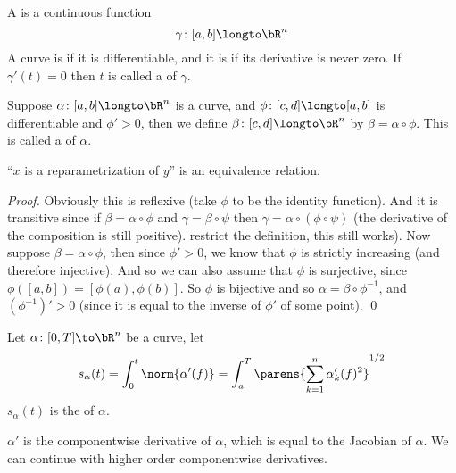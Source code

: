 \begin{defn*}

    A  is a continuous function
    \[ \gamma\colon[a,b]\longto\bR^n \]
    A curve is  if it is differentiable, and it is  if its derivative is never zero.
    If $\gamma'(t)=0$ then $t$ is called a  of $\gamma$.

\end{defn*}

\begin{defn*}

    Suppose $\alpha\colon[a,b]\longto\bR^n$ is a curve, and $\phi\colon[c,d]\longto[a,b]$ is differentiable and $\phi'>0$, then we define $\beta\colon[c,d]\longto\bR^n$ by $\beta=\alpha\circ\phi$.
    This is called a  of $\alpha$.

\end{defn*}

\begin{prop*}

    ``$x$ is a reparametrization of $y$'' is an equivalence relation.

\end{prop*}

\begin{proof}

    Obviously this is reflexive (take $\phi$ to be the identity function).
    And it is transitive since if $\beta=\alpha\circ\phi$ and $\gamma=\beta\circ\psi$ then $\gamma=\alpha\circ(\phi\circ\psi)$ (the derivative of the composition is still positive).
    restrict the definition, this still works).
    Now suppose $\beta=\alpha\circ\phi$, then since $\phi'>0$, we know that $\phi$ is strictly increasing (and therefore injective).
    And so we can also assume that $\phi$ is surjective, since $\phi([a,b])=[\phi(a),\phi(b)]$.
    So $\phi$ is bijective and so $\alpha=\beta\circ\phi^{-1}$, and $(\phi^{-1})'>0$ (since it is equal to the inverse of $\phi'$ of some point).
    \qed

\end{proof}

\begin{defn*}

    Let $\alpha\colon[0,T]\to\bR^n$ be a curve, let
    \[ s_\alpha(t) = \int_0^t\norm{\alpha'(f)} = \int_a^T\parens{\sum_{k=1}^n\alpha_k'(f)^2}^{1/2} \]
    $s_\alpha(t)$ is the  of $\alpha$.

    $\alpha'$ is the componentwise derivative of $\alpha$, which is equal to the Jacobian of $\alpha$.
    We can continue with higher order componentwise derivatives.

\end{defn*}

